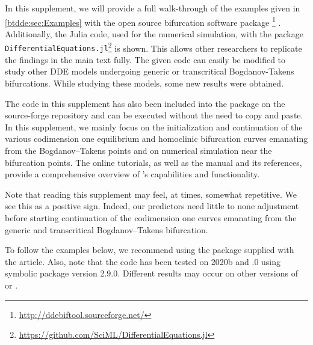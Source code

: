 In this supplement, we will provide a full walk-through of the examples given
in \cref{btdde:sec:Examples} with the open source bifurcation software package
\DDEBIFTOOL\footnote{\url{http://ddebiftool.sourceforge.net/}}
\cite{2014arXiv1406.7144S}. Additionally, the Julia code, used for the
numerical simulation, with the package {\tt
DifferentialEquations.jl}\footnote{\url{https://github.com/SciML/DifferentialEquations.jl}}
\cite{rackauckas2017differentialequations} is shown. This allows other researchers to replicate the findings in the main text fully. The given code can easily be modified to study other DDE models undergoing generic or transcritical Bogdanov-Takens bifurcations. While studying these models, some new results were
obtained.

The code in this supplement has also been included into the \DDEBIFTOOL package on the source-forge repository and can be executed without the need to copy and paste. In this supplement, we mainly focus on the initialization and continuation of the various codimension one equilibrium and homoclinic bifurcation curves emanating from the Bogdanov--Takens points and on numerical simulation near the bifurcation points. The online tutorials, as well as the manual and its references, provide a comprehensive overview of \DDEBIFTOOL's capabilities and functionality.

Note that reading this supplement may feel, at times, somewhat repetitive. We see
this as a positive sign. Indeed, our predictors need little to none adjustment
before starting continuation of the codimension one curves emanating from the
generic and transcritical Bogdanov--Takens bifurcation.

To follow the examples below, we recommend using the \DDEBIFTOOL package
supplied with the article. Also, note that the \MATLAB code has been tested on 
\MATLAB 2020b and .0 using \OCTAVE symbolic
package version 2.9.0. Different results may occur on other versions of 
\MATLAB or \OCTAVE.

